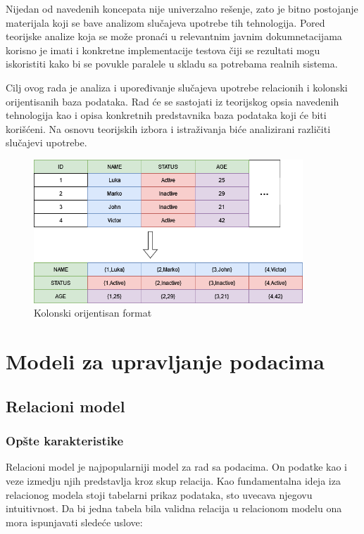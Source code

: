 \documentclass[12pt,oneside]{memoir}
\begin{document}
Nijedan od navedenih koncepata nije univerzalno rešenje, zato je bitno postojanje materijala koji se bave analizom slučajeva upotrebe tih tehnologija. Pored teorijske analize koja se može pronaći u relevantnim javnim dokumnetacijama korisno je imati i konkretne implementacije testova čiji se rezultati mogu iskoristiti kako bi se povukle paralele u skladu sa potrebama realnih  sistema. 

Cilj ovog rada je analiza i upoređivanje slučajeva upotrebe relacionih i kolonski orijentisanih baza podataka. Rad će se sastojati iz teorijskog opsia navedenih tehnologija kao i opisa konkretnih predstavnika baza podataka koji će biti korišćeni. Na osnovu teorijskih izbora i istraživanja biće analizirani različiti slučajevi upotrebe. 


\begin{figure}[!ht]
  \vspace*{4cm}
  \centering
  \includegraphics[width=0.9\textwidth]{relational-column-oriented.png}
  \caption{Kolonski orijentisan format}
  \label{fig:grafikon}
\end{figure}

\chapter{Modeli za upravljanje podacima}
\label{chp:razrada}
\section{Relacioni model}
\subsection{Opšte karakteristike}
Relacioni model je najpopularniji model za rad sa podacima. On podatke kao i veze izmedju njih predstavlja kroz skup relacija. Kao fundamentalna ideja iza relacionog modela stoji tabelarni prikaz podataka, sto uvecava njegovu intuitivnost. Da bi jedna tabela bila validna relacija u relacionom modelu ona mora ispunjavati sledeće uslove:
\end{document}
